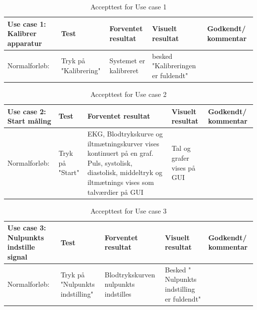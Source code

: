 \begin{table}[H]
\caption{Accepttest for Use case 1}\label{tab:tabel8}
\begin{tabular}{|>{\raggedright\arraybackslash}p{2.5cm}| >{\raggedright\arraybackslash}p{2.9cm} | >{\raggedright\arraybackslash}p{2.9cm} | >{\raggedright\arraybackslash}p{2.9cm} | >{\raggedright\arraybackslash}p{2.8cm} |}
   \hline
   \textbf{Use case 1: Kalibrer apparatur} &\textbf{Test}& \textbf{Forventet resultat} & \textbf{Visuelt resultat} & \textbf{Godkendt/ kommentar}\\ \hline
   Normalforløb:& Tryk på "Kalibrering" &Systemet er kalibreret & besked "Kalibreringen er fuldendt" &\\\hline
\end{tabular}
\end{table}



\begin{table}[H]
\caption{Accepttest for Use case 2}\label{tab:tabel8}
\begin{tabular}{|>{\raggedright\arraybackslash}p{2.5cm}| >{\raggedright\arraybackslash}p{2.9cm} | >{\raggedright\arraybackslash}p{2.9cm} | >{\raggedright\arraybackslash}p{2.9cm} | >{\raggedright\arraybackslash}p{2.8cm} |}
   \hline
   \textbf{Use case 2: Start måling } &\textbf{Test}& \textbf{Forventet resultat} & \textbf{Visuelt resultat} & \textbf{Godkendt/ kommentar}\\ \hline
   Normalforløb:& Tryk på "Start" & EKG, Blodtrykskurve og iltmætningskurver vises kontinuert på en graf. \newline Puls, systolisk, diastolisk, middeltryk og iltmætnings vises som talværdier på GUI & Tal og grafer vises på GUI &\\\hline
\end{tabular}
\end{table}

\begin{table}[H]
\caption{Accepttest for Use case 3}\label{tab:tabel8}
\begin{tabular}{|>{\raggedright\arraybackslash}p{2.5cm}| >{\raggedright\arraybackslash}p{2.9cm} | >{\raggedright\arraybackslash}p{2.9cm} | >{\raggedright\arraybackslash}p{2.9cm} | >{\raggedright\arraybackslash}p{2.8cm} |}
   \hline
   \textbf{Use case 3: Nulpunkts indstille signal } &\textbf{Test}& \textbf{Forventet resultat} & \textbf{Visuelt resultat} & \textbf{Godkendt/ kommentar}\\ \hline
   Normalforløb:& Tryk på "Nulpunkts indstilling" & Blodtrykskurven nulpunkts indstilles & Besked " Nulpunkts indstilling er fuldendt" &\\\hline
\end{tabular}
\end{table}

